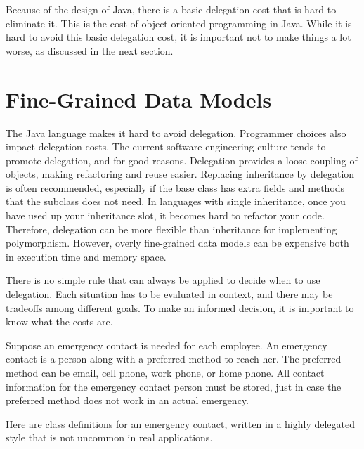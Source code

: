 Because of the design of Java, there is a basic delegation cost that is hard to eliminate it. This is the cost of object-oriented programming in Java. While it is hard to avoid this basic delegation cost, it is important not to make things a lot worse, as discussed in the next section. 

\section{Fine-Grained Data Models}
\label{fine-grained-data-models}

The Java language makes it hard to avoid delegation. Programmer choices also impact delegation costs.  The current software engineering culture tends to promote delegation, and for good reasons. Delegation provides a loose coupling of objects, making refactoring and reuse easier. Replacing inheritance by delegation is often recommended, especially if the base class has extra fields and methods that the subclass does not need. In languages with single inheritance, once you have used up your inheritance slot, it becomes hard to refactor your code. Therefore, delegation can be more flexible than inheritance for implementing polymorphism. However, overly fine-grained data models can be expensive both in execution time and memory space. 

There is no simple rule that can always be applied to decide when to use delegation. Each situation has to be evaluated in context, and there may be tradeoffs among different goals. To make an informed decision, it is important to know what the costs are.

\begin{example} 
Suppose an emergency contact is needed for each employee. An emergency contact is a person along with a preferred method to reach her.  The preferred method can be email, cell phone, work phone, or home phone. All contact information for the emergency contact person must be stored, just in case the preferred method does not work in an actual emergency. 
\end{example}
Here are class definitions for an emergency contact, written in a highly delegated style that is not uncommon in real applications. 

